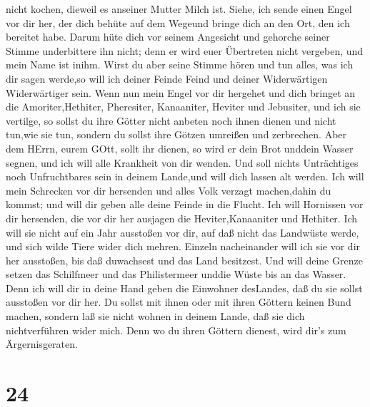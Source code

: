 nicht kochen, dieweil es anseiner Mutter Milch ist.  Siehe,
ich sende einen Engel vor dir her, der dich behüte auf dem Wegeund
bringe dich an den Ort, den ich bereitet habe.  Darum hüte
dich vor seinem Angesicht und gehorche seiner Stimme underbittere ihn
nicht; denn er wird euer Übertreten nicht vergeben, und mein Name ist
inihm.  Wirst du aber seine Stimme hören und tun alles, was
ich dir sagen werde,so will ich deiner Feinde Feind und deiner
Widerwärtigen Widerwärtiger sein.  Wenn nun mein Engel vor
dir hergehet und dich bringet an die Amoriter,Hethiter, Pheresiter,
Kanaaniter, Heviter und Jebusiter, und ich sie vertilge, 
so sollst du ihre Götter nicht anbeten noch ihnen dienen und nicht
tun,wie sie tun, sondern du sollst ihre Götzen umreißen und zerbrechen.
 Aber dem HErrn, eurem GOtt, sollt ihr dienen, so wird er
dein Brot unddein Wasser segnen, und ich will alle Krankheit von dir
wenden.  Und soll nichts Unträchtiges noch Unfruchtbares
sein in deinem Lande,und will dich lassen alt werden.  Ich
will mein Schrecken vor dir hersenden und alles Volk verzagt
machen,dahin du kommst; und will dir geben alle deine Feinde in die
Flucht.  Ich will Hornissen vor dir hersenden, die vor dir
her ausjagen die Heviter,Kanaaniter und Hethiter.  Ich will
sie nicht auf ein Jahr ausstoßen vor dir, auf daß nicht das Landwüste
werde, und sich wilde Tiere wider dich mehren.  Einzeln
nacheinander will ich sie vor dir her ausstoßen, bis daß duwachsest und
das Land besitzest.  Und will deine Grenze setzen das
Schilfmeer und das Philistermeer unddie Wüste bis an das Wasser. Denn
ich will dir in deine Hand geben die Einwohner desLandes, daß du sie
sollst ausstoßen vor dir her.  Du sollst mit ihnen oder mit
ihren Göttern keinen Bund machen,  sondern laß sie nicht
wohnen in deinem Lande, daß sie dich nichtverführen wider mich. Denn wo
du ihren Göttern dienest, wird dir's zum Ärgernisgeraten.

\hypertarget{section-23}{%
\section{24}\label{section-23}}

